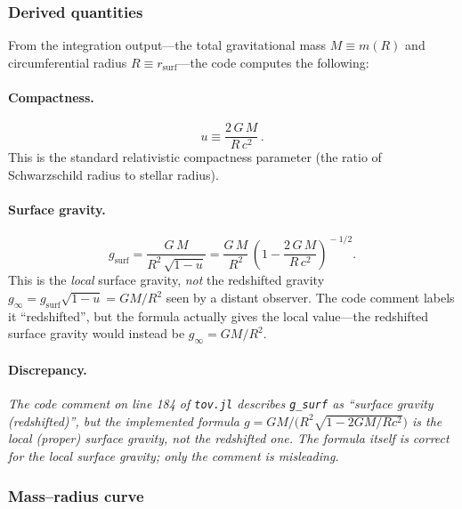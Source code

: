\subsubsection{Derived quantities}

From the integration output---the total gravitational mass $M\equiv m(R)$
and circumferential radius $R\equiv r_{\text{surf}}$---the code computes
the following:

\paragraph{Compactness.}
\begin{equation}
  u \equiv \frac{2\,G\,M}{R\,c^{2}}\,.
  \label{eq:compactness}
\end{equation}
This is the standard relativistic compactness parameter (the ratio of
Schwarzschild radius to stellar radius).

\paragraph{Surface gravity.}
\begin{equation}
  g_{\text{surf}} = \frac{G\,M}{R^{2}\,\sqrt{1-u}}
                   = \frac{G\,M}{R^{2}}\,
                     \left(1 - \frac{2\,G\,M}{R\,c^{2}}\right)^{\!-1/2}.
  \label{eq:surface_gravity}
\end{equation}
%
This is the \emph{local} surface gravity, \emph{not} the
redshifted gravity $g_{\infty}=g_{\text{surf}}\sqrt{1-u}=GM/R^{2}$
seen by a distant observer.  The code comment labels it
``redshifted'', but the formula actually gives the local value---the
redshifted surface gravity would instead be $g_{\infty}=GM/R^{2}$.

\paragraph{Discrepancy.}
\emph{The code comment on line 184 of \texttt{tov.jl} describes
\texttt{g\_surf} as ``surface gravity (redshifted)'', but the implemented
formula $g = GM/\bigl(R^{2}\sqrt{1-2GM/Rc^{2}}\bigr)$ is the local
(proper) surface gravity, not the redshifted one.  The formula itself is
correct for the local surface gravity; only the comment is misleading.}

\subsubsection{Mass--radius curve}


